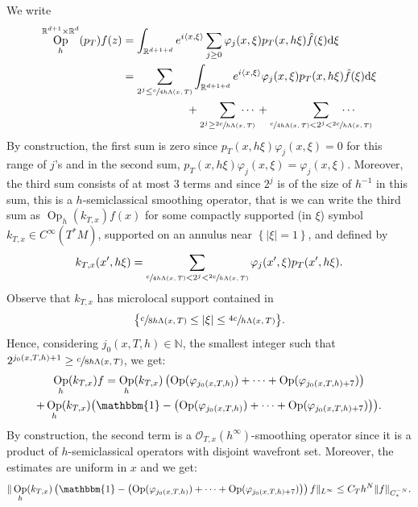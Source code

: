 \documentclass[10pt]{amsart}
\newcommand{\R}{\mathbb{R}}
\newcommand{\N}{\mathbb{N}}
\newcommand{\mc}{\mathcal}
\newcommand{\dd}{\mathrm{d}}
\DeclareMathOperator{\Op}{Op}
\theoremstyle{plain}
\theoremstyle{definition}
\begin{document}
We write
\begin{equation}
\label{equation:splitting}
\begin{split}
\Op^{\R^{d+1} \times \R^{d}}_h( p_T )f (z) & = \int_{\R^{d+1+d}} e^{i \langle x, \xi \rangle} \sum_{j \geq 0} \varphi_j(x,\xi) p_T(x,h\xi) \hat{f}(\xi) \dd \xi \\
& = \sum_{2^{j} \leq \sfrac{c}{4h\Lambda(x,T)}} \int_{\R^{d+1+d}} e^{i \langle x, \xi \rangle} \varphi_j(x,\xi) p_T(x,h\xi) \hat{f}(\xi) \dd \xi \\
& \hspace{2cm} + \sum_{2^{j} \geq \sfrac{2c}{h \Lambda(x,T)}}\hspace*{-.5cm}\cdots{} + \sum_{\sfrac{c}{4h \Lambda(x,T)} < 2^j < \sfrac{2c}{h\Lambda(x,T)}}\hspace*{-1cm} \cdots
\end{split}
\end{equation}
By construction, the first sum is zero since $p_T(x,h \xi) \varphi_j(x,\xi) = 0$ for this range of $j$'s and in the second sum, $p_T(x,h\xi) \varphi_j(x,\xi) = \varphi_j(x,\xi)$. Moreover, the third sum consists of at most $3$ terms and since $2^j$ is of the size of $h^{-1}$ in this sum, this is a $h$-semiclassical smoothing operator, that is we can write the third sum as $\Op_h(k_{T,x})f(x)$ for some compactly supported (in $\xi$) symbol $k_{T,x} \in C^\infty(T^*M)$, supported on an annulus near $\left\{|\xi|=1\right\}$, and defined by
\[
k_{T,x}(x',h\xi) = \sum_{\sfrac{c}{4h \Lambda(x,T)} < 2^j < \sfrac{2c}{h\Lambda(x,T)}} \varphi_j(x',\xi) p_T(x',h\xi).
\]
Observe that $k_{T,x}$ has microlocal support contained in
\[
\bigl\{ \sfrac{c}{8h\Lambda(x,T)} \leq |\xi| \leq \sfrac{4c}{h\Lambda(x,T)} \bigr\}.
\]
Hence, considering $j_0(x,T,h) \in \N$, the smallest integer such that $2^{j_0(x,T,h)+1} \geq \sfrac{c}{8h\Lambda(x,T)}$, we get:\vspace*{-5pt}
\begin{multline*}
\Op_h(k_{T,x})f = \Op_h(k_{T,x})\left( \Op(\varphi_{j_0(x,T,h)}) + \cdots + \Op(\varphi_{j_0(x,T,h)+7}) \right) \\
+ \Op_h(k_{T,x})\bigl( \mathbbm{1} - \left(\Op(\varphi_{j_0(x,T,h)}) + \cdots + \Op(\varphi_{j_0(x,T,h)+7}) \right) \bigr).
\end{multline*}
By construction, the second term is a $\mc{O}_{T,x}(h^\infty)$-smoothing operator since it is a product of $h$-semiclassical operators with disjoint wavefront set. Moreover, the estimates are uniform in $x$ and we get:
\[
\|\Op_h(k_{T,x})\left( \mathbbm{1} - \left(\Op(\varphi_{j_0(x,T,h)}) + \cdots + \Op(\varphi_{j_0(x,T,h)+7}) \right) \right)f\|_{L^\infty} \leq C_T h^N \|f\|_{C^{-N}_*}.
\]
\end{document}
